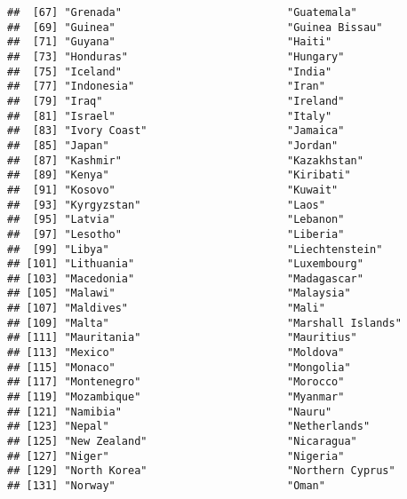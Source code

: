 \documentclass[]{article}
\begin{document}
\begin{verbatim}
##  [67] "Grenada"                          "Guatemala"                       
##  [69] "Guinea"                           "Guinea Bissau"                   
##  [71] "Guyana"                           "Haiti"                           
##  [73] "Honduras"                         "Hungary"                         
##  [75] "Iceland"                          "India"                           
##  [77] "Indonesia"                        "Iran"                            
##  [79] "Iraq"                             "Ireland"                         
##  [81] "Israel"                           "Italy"                           
##  [83] "Ivory Coast"                      "Jamaica"                         
##  [85] "Japan"                            "Jordan"                          
##  [87] "Kashmir"                          "Kazakhstan"                      
##  [89] "Kenya"                            "Kiribati"                        
##  [91] "Kosovo"                           "Kuwait"                          
##  [93] "Kyrgyzstan"                       "Laos"                            
##  [95] "Latvia"                           "Lebanon"                         
##  [97] "Lesotho"                          "Liberia"                         
##  [99] "Libya"                            "Liechtenstein"                   
## [101] "Lithuania"                        "Luxembourg"                      
## [103] "Macedonia"                        "Madagascar"                      
## [105] "Malawi"                           "Malaysia"                        
## [107] "Maldives"                         "Mali"                            
## [109] "Malta"                            "Marshall Islands"                
## [111] "Mauritania"                       "Mauritius"                       
## [113] "Mexico"                           "Moldova"                         
## [115] "Monaco"                           "Mongolia"                        
## [117] "Montenegro"                       "Morocco"                         
## [119] "Mozambique"                       "Myanmar"                         
## [121] "Namibia"                          "Nauru"                           
## [123] "Nepal"                            "Netherlands"                     
## [125] "New Zealand"                      "Nicaragua"                       
## [127] "Niger"                            "Nigeria"                         
## [129] "North Korea"                      "Northern Cyprus"                 
## [131] "Norway"                           "Oman"                            

\end{verbatim}
\end{document}
